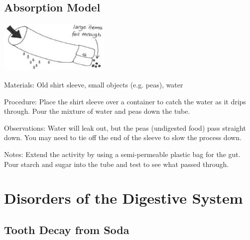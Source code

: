 \begin{multicols}{2}
\subsection{Absorption Model} %

\begin{center}
\includegraphics[width=0.4\textwidth]{./img/vso/absorption-model.jpg}
\end{center}

\begin{description*}
\item[Materials:]{Old shirt sleeve, small objects (e.g. peas), water}
\item[Procedure:]{Place the shirt sleeve over a container to catch the water as it drips
through. Pour the mixture of water and peas down the tube. }
\item[Observations:]{Water
will leak out, but the peas (undigested food) pass straight down. You
may need to tie off the end of the sleeve to slow the process down.}
\item[Notes:]{Extend the activity by using a semi-permeable plastic bag for the gut.
Pour starch and sugar into the tube and test to see what passed
through.}
\end{description*}


\section*{Disorders of the Digestive System}


\subsection{Tooth Decay from Soda} %


\end{multicols}
